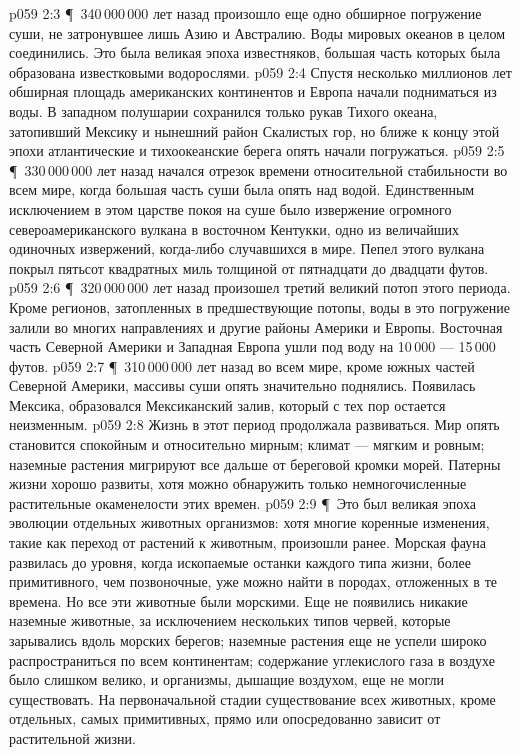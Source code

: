\vs p059 2:3 \P\ 340\,000\,000 лет назад произошло еще одно обширное погружение суши, не затронувшее лишь Азию и Австралию. Воды мировых океанов в целом соединились. Это была великая эпоха известняков, большая часть которых была образована известковыми водорослями.
\vs p059 2:4 Спустя несколько миллионов лет обширная площадь американских континентов и Европа начали подниматься из воды. В западном полушарии сохранился только рукав Тихого океана, затопивший Мексику и нынешний район Скалистых гор, но ближе к концу этой эпохи атлантические и тихоокеанские берега опять начали погружаться.
\vs p059 2:5 \P\ 330\,000\,000 лет назад начался отрезок времени относительной стабильности во всем мире, когда большая часть суши была опять над водой. Единственным исключением в этом царстве покоя на суше было извержение огромного североамериканского вулкана в восточном Кентукки, одно из величайших одиночных извержений, когда\hyp{}либо случавшихся в мире. Пепел этого вулкана покрыл пятьсот квадратных миль толщиной от пятнадцати до двадцати футов.
\vs p059 2:6 \P\ 320\,000\,000 лет назад произошел третий великий потоп этого периода. Кроме регионов, затопленных в предшествующие потопы, воды в это погружение залили во многих направлениях и другие районы Америки и Европы. Восточная часть Северной Америки и Западная Европа ушли под воду на 10\,000 --- 15\,000 футов.
\vs p059 2:7 \P\ 310\,000\,000 лет назад во всем мире, кроме южных частей Северной Америки, массивы суши опять значительно поднялись. Появилась Мексика, образовался Мексиканский залив, который с тех пор остается неизменным.
\vs p059 2:8 Жизнь в этот период продолжала развиваться. Мир опять становится спокойным и относительно мирным; климат --- мягким и ровным; наземные растения мигрируют все дальше от береговой кромки морей. Патерны жизни хорошо развиты, хотя можно обнаружить только немногочисленные растительные окаменелости этих времен.
\vs p059 2:9 \P\ Это был великая эпоха эволюции отдельных животных организмов: хотя многие коренные изменения, такие как переход от растений к животным, произошли ранее. Морская фауна развилась до уровня, когда ископаемые останки каждого типа жизни, более примитивного, чем позвоночные, уже можно найти в породах, отложенных в те времена. Но все эти животные были морскими. Еще не появились никакие наземные животные, за исключением нескольких типов червей, которые зарывались вдоль морских берегов; наземные растения еще не успели широко распространиться по всем континентам; содержание углекислого газа в воздухе было слишком велико, и организмы, дышащие воздухом, еще не могли существовать. На первоначальной стадии существование всех животных, кроме отдельных, самых примитивных, прямо или опосредованно зависит от растительной жизни.
